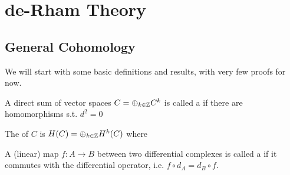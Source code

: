 \documentclass{article}
\begin{document}
\section{de-Rham Theory}
\subsection{General Cohomology}
We will start with some basic definitions and results, with very few proofs for now. 

\begin{definition}
	A direct sum of vector spaces $C = \oplus_{k \in \mathbb{Z}} C^k$ is called a  if there are homomorphisms
	s.t. $d^2=0$
\end{definition}

\begin{definition}
	The  of $C$ is $H(C) = \oplus_{k \in \mathbb{Z}} H^k(C)$ where 
\end{definition}

\begin{definition}
	A (linear) map $f:A \to B$ between two differential complexes is called a  if it commutes with the differential operator, i.e. $f \circ d_A = d_B \circ f$. 	
\end{definition}
\end{document}
